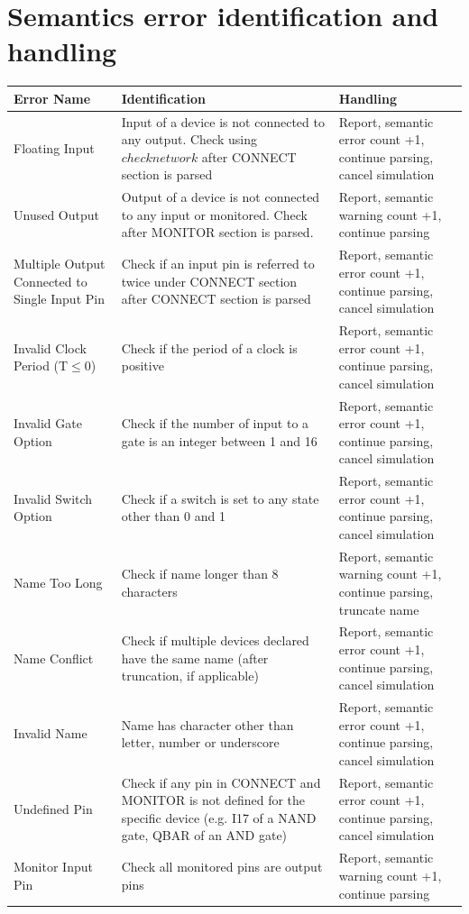 \documentclass[12pt]{article}
\begin{document}
\section{Semantics error identification and handling}
\begin{center}
	\begin{tabular}{|m{3cm} | m{6cm} | m{8cm} |}
		\hline
		Error Name & Identification & Handling \\
		\hline
		Floating Input & Input of a device is not connected to any output. Check using $checknetwork$ after CONNECT section is parsed & Report, semantic error count +1, continue parsing,  cancel simulation \\
		\hline
		Unused Output & Output of a device is not connected to any input or monitored. Check after MONITOR section is parsed. & Report, semantic warning count +1, continue parsing \\
		\hline
		Multiple Output Connected to Single Input Pin & Check if an input pin is referred to twice under CONNECT section after CONNECT section is parsed & Report, semantic error count +1, continue parsing,  cancel simulation \\
		\hline
		Invalid Clock Period (T$\leq$0) & Check if the period of a clock is positive & Report, semantic error count +1, continue parsing,  cancel simulation \\
		\hline
		Invalid Gate Option & Check if the number of input to a gate is an integer between 1 and 16 & Report, semantic error count +1, continue parsing,  cancel simulation \\
		\hline
		Invalid Switch Option & Check if a switch is set to any state other than 0 and 1 & Report, semantic error count +1, continue parsing,  cancel simulation \\
		\hline
		Name Too Long & Check if name longer than 8 characters & Report, semantic warning count +1, continue parsing, truncate name \\
		\hline
		Name Conflict & Check if multiple devices declared have the same name (after truncation, if applicable) & Report, semantic error count +1, continue parsing, cancel simulation \\
		\hline
		Invalid Name & Name has character other than letter, number or underscore & Report, semantic error count +1, continue parsing, cancel simulation \\
		\hline
		Undefined Pin & Check if any pin in CONNECT and MONITOR is not defined for the specific device (e.g. I17 of a NAND gate, QBAR of an AND gate) & Report, semantic error count +1, continue parsing,  cancel simulation \\
		\hline
		Monitor Input Pin & Check all monitored pins are output pins & Report, semantic warning count +1, continue parsing \\
		\hline
		
		
		
	\end{tabular}
\end{center}
\newpage
\end{document}
